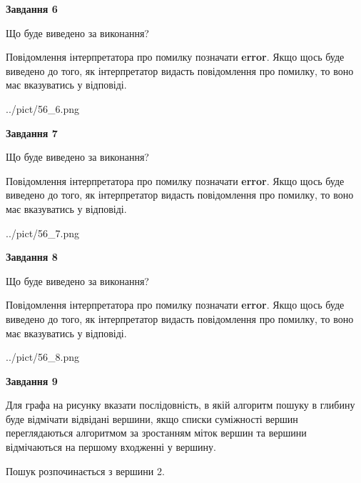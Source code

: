 \documentclass[12pt, ukrainian]{article}
\begin{document}
{\begin {large}
{\begin {center}\textbf{Завдання 6}\end {center}}\par
Що буде виведено за виконання?

Повідомлення інтерпретатора про помилку позначати \textbf{error}.
Якщо щось буде виведено до того, як інтерпретатор видасть повідомлення про помилку, 
то воно має вказуватись у відповіді. \par


\begin{center}
	{../pict/56_6.png}
\end{center}
\newpage

{\begin {center}\textbf{Завдання 7}\end {center}}\par
Що буде виведено за виконання?

Повідомлення інтерпретатора про помилку позначати \textbf{error}.
Якщо щось буде виведено до того, як інтерпретатор видасть повідомлення про помилку, 
то воно має вказуватись у відповіді. \par


\begin{center}
	{../pict/56_7.png}
\end{center}
\newpage

{\begin {center}\textbf{Завдання 8}\end {center}}\par
Що буде виведено за виконання?

Повідомлення інтерпретатора про помилку позначати \textbf{error}.
Якщо щось буде виведено до того, як інтерпретатор видасть повідомлення про помилку, 
то воно має вказуватись у відповіді. \par


\begin{center}
	{../pict/56_8.png}
\end{center}
\newpage

{\begin {center}\textbf{Завдання 9}\end {center}}\par
Для графа на рисунку вказати послідовність, в якій алгоритм пошуку в глибину буде відмічати відвідані вершини, якщо списки суміжності вершин переглядаються алгоритмом за зростанням міток вершин та вершини відмічаються на першому вход\-женні у вершину.\par
Пошук розпочинається з вершини 2.\par


\end{large}}
\end{document}
